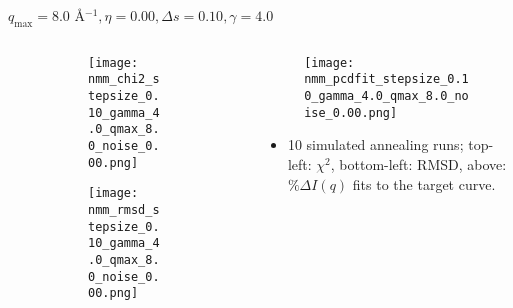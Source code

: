 \documentclass{beamer}
\begin{document}
\begin{frame}{$ q_{\textrm{max}}=8.0 $ \AA $^{-1}, \eta=0.00, \Delta s=0.10, \gamma=4.0$}
	\begin{columns}
		\begin{column}{.5\textwidth}
			\begin{figure}[H]
			\centering
			\begin{subfigure}[b]{\textwidth}
				\centering
				\texttt{[image: nmm\_chi2\_stepsize\_0.10\_gamma\_4.0\_qmax\_8.0\_noise\_0.00.png]}
				\label{fig:}
			\end{subfigure}
			\begin{subfigure}[b]{\textwidth}
				\centering
				\texttt{[image: nmm\_rmsd\_stepsize\_0.10\_gamma\_4.0\_qmax\_8.0\_noise\_0.00.png]}
				\label{fig:}
			\end{subfigure}
			\end{figure}
		\end{column}
		\begin{column}{.5\textwidth}
			\begin{figure}[H]
				\centering
				\texttt{[image: nmm\_pcdfit\_stepsize\_0.10\_gamma\_4.0\_qmax\_8.0\_noise\_0.00.png]}
				\label{fig:}
			\end{figure}
			\begin{itemize}
				\item 10 simulated annealing runs; top-left: $\chi^2$, bottom-left: RMSD, above: $\%\Delta I(q)$ fits to the target curve.
			\end{itemize}
		\end{column}
	\end{columns}
\end{frame}
 
\end{document}
